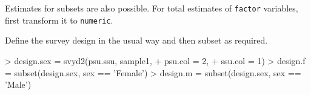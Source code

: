 \documentclass[a4paper]{article}
\begin{document}
Estimates for subsets are also possible. For total estimates of \texttt{factor} variables, first transform it to \texttt{numeric}.
\begin{Schunk}
\end{Schunk}

Define the survey design in the usual way and then subset as required.
\begin{Schunk}
\begin{Sinput}
> design.sex = svyd2(psu.ssu, sample1,
+                    psu.col = 2,
+                    ssu.col = 1)
> design.f = subset(design.sex, sex == 'Female')
> design.m = subset(design.sex, sex == 'Male')
\end{Sinput}
\end{Schunk}
\end{document}
